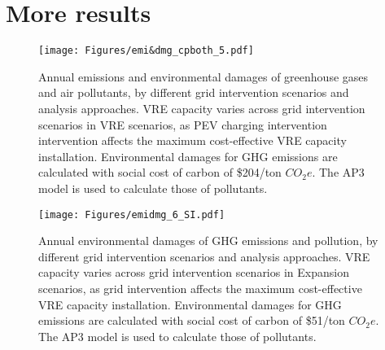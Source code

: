 \documentclass[9pt,twoside,lineno]{pnas-new}
\begin{document}
\section*{More results}

\newpage
\begin{figure}[!ht]
    \centering
    \texttt{[image: Figures/emi\&dmg\_cpboth\_5.pdf]}
    \caption{Annual emissions and environmental damages of greenhouse gases and air pollutants, by different grid intervention scenarios and analysis approaches. VRE capacity varies across grid intervention scenarios in VRE scenarios, as PEV charging intervention intervention affects the maximum cost-effective VRE capacity installation. Environmental damages for GHG emissions are calculated with social cost of carbon of \$204/ton $CO_2e$. The AP3 model is used to calculate those of pollutants.}
    \label{fig:emidmg51}
\end{figure}
\newpage
\begin{figure}[!ht]
    \centering
    \texttt{[image: Figures/emidmg\_6\_SI.pdf]}
    \caption{Annual environmental damages of GHG emissions and pollution, by different grid intervention scenarios and analysis approaches. VRE capacity varies across grid intervention scenarios in Expansion scenarios, as grid intervention affects the maximum cost-effective VRE capacity installation. Environmental damages for GHG emissions are calculated with social cost of carbon of \$51/ton $CO_2e$. The AP3 model is used to calculate those of pollutants.}
    \label{fig:emidmg51}
\end{figure}


\FloatBarrier



\end{document}
